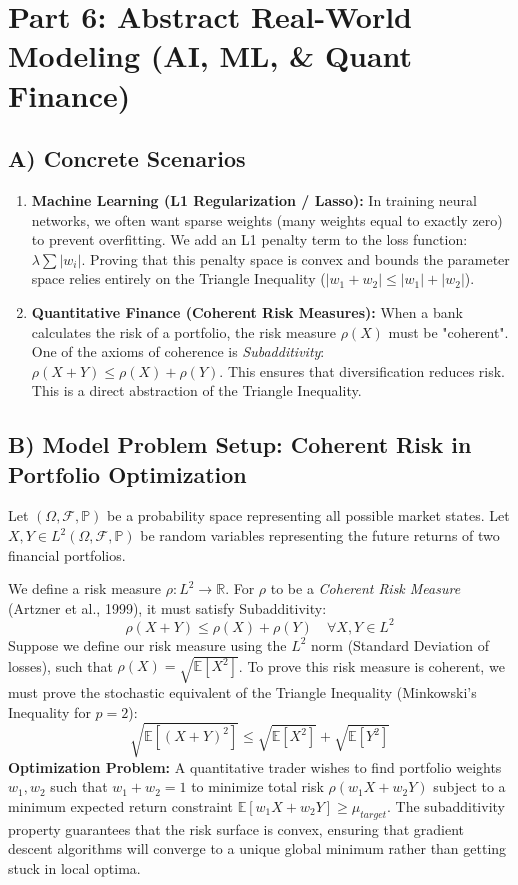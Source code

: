 \documentclass[11pt]{article}
\newcommand{\R}{\mathbb{R}}
\newcommand{\E}{\mathbb{E}}
\newcommand{\Prob}{\mathbb{P}}
\newcommand{\abs}[1]{\left|#1\right|}
\begin{document}
\section{Part 6: Abstract Real-World Modeling (AI, ML, \& Quant Finance)}

\subsection{A) Concrete Scenarios}
\begin{enumerate}
    \item \textbf{Machine Learning (L1 Regularization / Lasso):} In training neural networks, we often want sparse weights (many weights equal to exactly zero) to prevent overfitting. We add an L1 penalty term to the loss function: $\lambda \sum \abs{w_i}$. Proving that this penalty space is convex and bounds the parameter space relies entirely on the Triangle Inequality ($\abs{w_1 + w_2} \le \abs{w_1} + \abs{w_2}$).
    \item \textbf{Quantitative Finance (Coherent Risk Measures):} When a bank calculates the risk of a portfolio, the risk measure $\rho(X)$ must be "coherent". One of the axioms of coherence is \textit{Subadditivity}: $\rho(X + Y) \le \rho(X) + \rho(Y)$. This ensures that diversification reduces risk. This is a direct abstraction of the Triangle Inequality.
\end{enumerate}

\subsection{B) Model Problem Setup: Coherent Risk in Portfolio Optimization}
Let $(\Omega, \mathcal{F}, \Prob)$ be a probability space representing all possible market states. Let $X, Y \in L^2(\Omega, \mathcal{F}, \Prob)$ be random variables representing the future returns of two financial portfolios. 

We define a risk measure $\rho: L^2 \to \R$. For $\rho$ to be a \textit{Coherent Risk Measure} (Artzner et al., 1999), it must satisfy Subadditivity:
\[ \rho(X + Y) \le \rho(X) + \rho(Y) \quad \forall X, Y \in L^2 \]
Suppose we define our risk measure using the $L^2$ norm (Standard Deviation of losses), such that $\rho(X) = \sqrt{\E[X^2]}$. 
To prove this risk measure is coherent, we must prove the stochastic equivalent of the Triangle Inequality (Minkowski's Inequality for $p=2$):
\[ \sqrt{\E[(X+Y)^2]} \le \sqrt{\E[X^2]} + \sqrt{\E[Y^2]} \]
\textbf{Optimization Problem:} A quantitative trader wishes to find portfolio weights $w_1, w_2$ such that $w_1 + w_2 = 1$ to minimize total risk $\rho(w_1 X + w_2 Y)$ subject to a minimum expected return constraint $\E[w_1 X + w_2 Y] \ge \mu_{target}$. The subadditivity property guarantees that the risk surface is convex, ensuring that gradient descent algorithms will converge to a unique global minimum rather than getting stuck in local optima.
\end{document}
